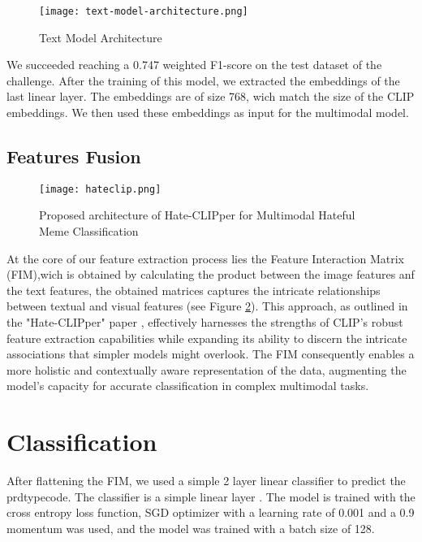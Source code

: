 \begin{figure}[H]
    \centering
    \texttt{[image: text-model-architecture.png]}
    \caption{Text Model Architecture}
    \label{fig:text-model}
\end{figure}


We succeeded reaching a 0.747 weighted F1-score on the test dataset of the challenge. After the training of this model, we extracted the embeddings of the last linear layer. The embeddings are of size 768, wich match the size of the CLIP embeddings. We then used these embeddings as input for the multimodal model.

\subsection{Features Fusion}

\begin{figure}[H]
    \centering
    \texttt{[image: hateclip.png]}
    \caption{\label{fig:hateclipper} Proposed architecture of Hate-CLIPper for Multimodal Hateful Meme Classification}

\end{figure}

At the core of our feature extraction process lies the Feature Interaction Matrix (FIM),wich is obtained by calculating the product between the image features anf the text features, the obtained matrices captures the intricate relationships between textual and visual features (see Figure \ref{fig:hateclipper}). This approach, as outlined in the "Hate-CLIPper" paper \cite{kumar2022hateclipper}, effectively harnesses the strengths of CLIP's robust feature extraction capabilities while expanding its ability to discern the intricate associations that simpler models might overlook. The FIM consequently enables a more holistic and contextually aware representation of the data, augmenting the model's capacity for accurate classification in complex multimodal tasks.

\section{Classification}

After flattening  the FIM, we used a simple 2 layer linear classifier to predict the prdtypecode. The classifier is a simple linear layer . The model is trained with the cross entropy loss function, SGD optimizer with a learning rate of 0.001 and a 0.9 momentum was used, and the model was trained with a batch size of 128.

